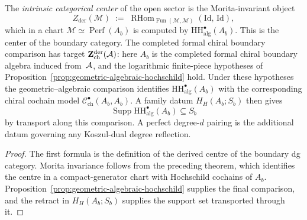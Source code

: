 \begin{corollary}
\label{cor:thqg-intrinsic-bulk}
\ClaimStatusProvedHere
The \emph{intrinsic categorical center} of the open sector is the
Morita-invariant object
\begin{equation}\label{eq:thqg-intrinsic-bulk}
Z_{\mathrm{der}}(\mathcal{M})
\;:=\;
\operatorname{RHom}_{\operatorname{Fun}(\mathcal{M},
\mathcal{M})}(\mathrm{Id},\, \mathrm{Id}),
\end{equation}
which in a chart $\mathcal{M} \simeq \operatorname{Perf}(A_b)$
is computed by $\mathrm{HH}^{\bullet}_{\mathrm{alg}}(A_b)$.
This is the center of the boundary category.  The completed formal
chiral boundary comparison has target
$\mathbf{Z}^{\mathrm{der}}_{\mathrm{ch}}(\mathcal{A})$: here $A_b$ is the
completed formal chiral boundary algebra induced from~$\mathcal{A}$, and the
logarithmic finite-piece hypotheses of
Proposition~\ref{prop:geometric-algebraic-hochschild} hold.  Under
these hypotheses the geometric--algebraic comparison identifies
$\mathrm{HH}^{\bullet}_{\mathrm{alg}}(A_b)$ with the corresponding
chiral cochain model
$\mathcal{C}^{\bullet}_{\mathrm{ch}}(A_b, A_b)$.  A family datum
$H_H(A_b;S_b)$ then gives
\[
 \operatorname{Supp}\mathrm{HH}^{\bullet}_{\mathrm{alg}}(A_b)
 \subseteq S_b
\]
by transport along this comparison.  A perfect degree-$d$ pairing is
the additional datum governing any Koszul-dual degree reflection.
\end{corollary}

\begin{proof}
The first formula is the definition of the derived centre of the
boundary dg category. Morita invariance follows from the preceding
theorem, which identifies the centre in a compact-generator chart with
Hochschild cochains of $A_b$.  Proposition~\ref{prop:geometric-algebraic-hochschild}
supplies the final comparison, and the retract in $H_H(A_b;S_b)$
supplies the support set transported through it.
\end{proof}

